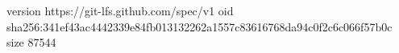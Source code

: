 version https://git-lfs.github.com/spec/v1
oid sha256:341ef43ac4442339e84fb013132262a1557c83616768da94c0f2c6c066f57b0c
size 87544

